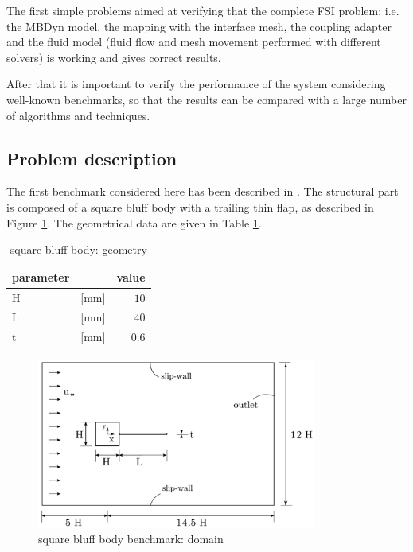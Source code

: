 The first simple problems aimed at verifying that the complete FSI problem: i.e. the MBDyn model, the mapping with the interface mesh, the coupling adapter and the fluid model (fluid flow and mesh movement performed with different solvers) is working and gives correct results.

After that it is important to verify the performance of the system considering well-known benchmarks, so that the results can be compared with a large number of algorithms and techniques.

\subsection{Problem description}

The first benchmark considered here has been described in \cite{ramm1998fluid}. The structural part is composed of a square bluff body with a trailing thin flap, as described in Figure \ref{fig:sq_domain}. The geometrical data are given in Table \ref{table:sq-geom}.

\begin{table}[!htb]
	\begin{center}
		\begin{tabular}{ l c | r } 
			parameter & & value   \\ 
			\hline
			H  & [\si{mm}] & $10$     \\
			L & [\si{mm}] & $40$  \\
			t  & [\si{mm}] & $0.6$  \\			
		\end{tabular}
	\end{center}
	\caption{square bluff body: geometry}
	\label{table:sq-geom}
\end{table}

\begin{figure}[htbp!]
	\centering
	\includegraphics[width=0.82\textwidth, trim=0 0 0 0, clip]{images/sq-cyl/sq-cyl-domain.png}
	\caption{square bluff body benchmark: domain}
	\label{fig:sq_domain}
\end{figure}

